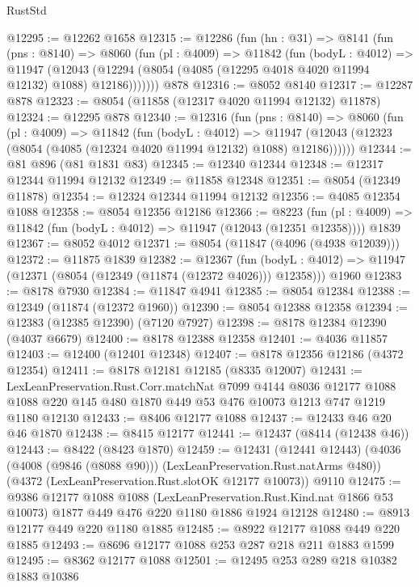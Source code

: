 \begin{lexlean}{RustStd}
\begin{coremodule}
@12295 := @12262 @1658
@12315 := @12286
    (fun (hn : @31) =>
    @8141
      (fun (pns : @8140) =>
      @8060
        (fun (pl : @4009) =>
        @11842
          (fun (bodyL : @4012) =>
          @11947
            (@12043 (@12294 (@8054 (@4085 (@12295 @4018 @4020 @11994 @12132) @1088) @12186)))))))
    @878
@12316 := @8052 @8140
@12317 := @12287 @878
@12323 := @8054 (@11858 (@12317 @4020 @11994 @12132) @11878)
@12324 := @12295 @878
@12340 := @12316
    (fun (pns : @8140) =>
    @8060
      (fun (pl : @4009) =>
      @11842
        (fun (bodyL : @4012) =>
        @11947 (@12043 (@12323 (@8054 (@4085 (@12324 @4020 @11994 @12132) @1088) @12186))))))
@12344 := @81 @896 (@81 @1831 @83)
@12345 := @12340 @12344
@12348 := @12317 @12344 @11994 @12132
@12349 := @11858 @12348
@12351 := @8054 (@12349 @11878)
@12354 := @12324 @12344 @11994 @12132
@12356 := @4085 @12354 @1088
@12358 := @8054 @12356 @12186
@12366 := @8223
    (fun (pl : @4009) => @11842 (fun (bodyL : @4012) => @11947 (@12043 (@12351 @12358))))
    @1839
@12367 := @8052 @4012
@12371 := @8054 (@11847 (@4096 (@4938 @12039)))
@12372 := @11875 @1839
@12382 := @12367
    (fun (bodyL : @4012) => @11947 (@12371 (@8054 (@12349 (@11874 (@12372 @4026))) @12358)))
    @1960
@12383 := @8178 @7930
@12384 := @11847 @4941
@12385 := @8054 @12384
@12388 := @12349 (@11874 (@12372 @1960))
@12390 := @8054 @12388 @12358
@12394 := @12383 (@12385 @12390) (@7120 @7927)
@12398 := @8178 @12384 @12390 (@4037 @6679)
@12400 := @8178 @12388 @12358
@12401 := @4036 @11857
@12403 := @12400 (@12401 @12348)
@12407 := @8178 @12356 @12186 (@4372 @12354)
@12411 := @8178 @12181 @12185 (@8335 @12007)
@12431 := LexLeanPreservation.Rust.Corr.matchNat
    @7099
    @4144
    @8036
    @12177
    @1088
    @1088
    @220
    @145
    @480
    @1870
    @449
    @53
    @476
    @10073
    @1213
    @747
    @1219
    @1180
    @12130
@12433 := @8406 @12177 @1088
@12437 := @12433 @46 @20 @46 @1870
@12438 := @8415 @12177
@12441 := @12437 (@8414 (@12438 @46))
@12443 := @8422 (@8423 @1870)
@12459 := @12431
    (@12441 @12443)
    (@4036 (@4008 (@9846 (@8088 @90))) (LexLeanPreservation.Rust.natArms @480))
    (@4372 (LexLeanPreservation.Rust.slotOK @12177 @10073))
    @9110
@12475 := @9386
    @12177
    @1088
    @1088
    (LexLeanPreservation.Rust.Kind.nat @1866 @53 @10073)
    @1877
    @449
    @476
    @220
    @1180
    @1886
    @1924
    @12128
@12480 := @8913 @12177 @449 @220 @1180 @1885
@12485 := @8922 @12177 @1088 @449 @220 @1885
@12493 := @8696 @12177 @1088 @253 @287 @218 @211 @1883 @1599
@12495 := @8362 @12177 @1088
@12501 := @12495 @253 @289 @218 @10382 @1883 @10386

\end{coremodule}
\end{lexlean}

